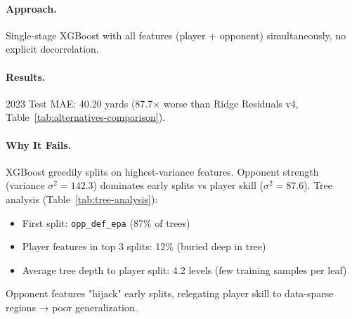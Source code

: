 \paragraph{Approach.}
Single-stage XGBoost with all features (player + opponent) simultaneously, no explicit decorrelation.

\paragraph{Results.}
2023 Test MAE: 40.20 yards (87.7× worse than Ridge Residuals v4, Table~\ref{tab:alternatives-comparison}).

\paragraph{Why It Fails.}
XGBoost greedily splits on highest-variance features. Opponent strength (variance $\sigma^2 = 142.3$) dominates early splits vs player skill ($\sigma^2 = 87.6$). Tree analysis (Table~\ref{tab:tree-analysis}):
\begin{itemize}[itemsep=2pt,parsep=0pt]
    \item First split: \texttt{opp\_def\_epa} (87\% of trees)
    \item Player features in top 3 splits: 12\% (buried deep in tree)
    \item Average tree depth to player split: 4.2 levels (few training samples per leaf)
\end{itemize}

Opponent features "hijack" early splits, relegating player skill to data-sparse regions → poor generalization.

